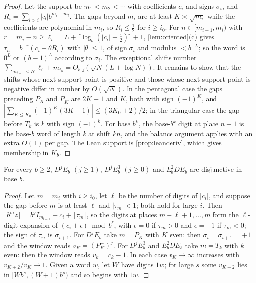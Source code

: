 \documentclass[11pt]{article}
\begin{document}
\begin{proof}
Let the support be $m_1<m_2<\cdots$ with coefficients $c_i$ and signs $\sigma_i$, and
$R_i=\sum_{l>i}|c_l|b^{m_i-m_l}$. The gaps beyond $m_i$ are at least $K\asymp\sqrt{m_i}$ while the
coefficients are polynomial in $m_i$, so $R_i\le\frac12$ for $i\ge i_0$. For $n\in[m_{i-1},m_i)$ with
$r=m_i-n\ge\ell_i=L+\lceil\log_b(|c_i|+\frac12)\rceil+1$, \cref{lem:oriented}(c) gives
$\tau_n=b^{-r}(c_i+\theta R_i)$ with $|\theta|\le1$, of sign $\sigma_i$ and modulus $<b^{-L}$; so the
word is $0^L$ or $(b-1)^L$ according to $\sigma_i$. The exceptional shifts number
$\sum_{m_{i-1}<N}\ell_i+m_{i_0}=O_{b,j}(\sqrt N(L+\log N))$. It remains to show that the shifts
whose next support point is positive and those whose next support point is negative differ in
number by $O(\sqrt N)$. In the pentagonal case the gaps preceding $P_K^-$ and $P_K^+$ are $2K-1$ and
$K$, both with sign $(-1)^K$, and $|\sum_{K\le K_0}(-1)^K(3K-1)|\le(3K_0+2)/2$; in the triangular case
the gap before $T_k$ is $k$ with sign $(-1)^k$. For base $b^k$, the base-$b^k$ digit at place
$n+1$ is the base-$b$ word of length $k$ at shift $kn$, and the balance argument applies with an extra
$O(1)$ per gap. The Lean support is \cref{prop:leanderiv}, which gives membership in $K_b$.
\end{proof}

\begin{theorem}[Disjunctivity]\label{thm:disjunctive}
For every $b\ge2$, $D^jE_b$ $(j\ge1)$, $D^jE_b^3$ $(j\ge0)$ and $E_b^2DE_b$ are disjunctive in base $b$.
\end{theorem}

\begin{proof}
Let $m=m_i$ with $i\ge i_0$, let $\ell$ be the number of digits of $|c_i|$, and suppose the gap before
$m$ is at least $\ell$ and $|\tau_m|<1$; both hold for large $i$. Then
$\lfloor b^mz\rfloor=b^gI_{m_{i-1}}+c_i+\lfloor\tau_m\rfloor$, so the digits at places
$m-\ell+1,\dots,m$ form the $\ell$-digit expansion of $(c_i+\epsilon)\bmod b^\ell$, with $\epsilon=0$
if $\tau_m>0$ and $\epsilon=-1$ if $\tau_m<0$; the sign of $\tau_m$ is $\sigma_{i+1}$. For $D^jE_b$ take
$m=P_K^-$ with $K$ even: then $\sigma_i=\sigma_{i+1}=+1$ and the window reads $v_K=(P_K^-)^j$. For
$D^jE_b^3$ and $E_b^2DE_b$ take $m=T_k$ with $k$ even: then the window reads $v_k=c_k-1$. In each case
$v_K\to\infty$ increases with $v_{K+2}/v_K\to1$. Given a word $w$, let $W$ have digits $1w$; for large
$s$ some $v_{K+2}$ lies in $[Wb^s,(W+1)b^s)$ and so begins with $1w$.
\end{proof}
\end{document}
